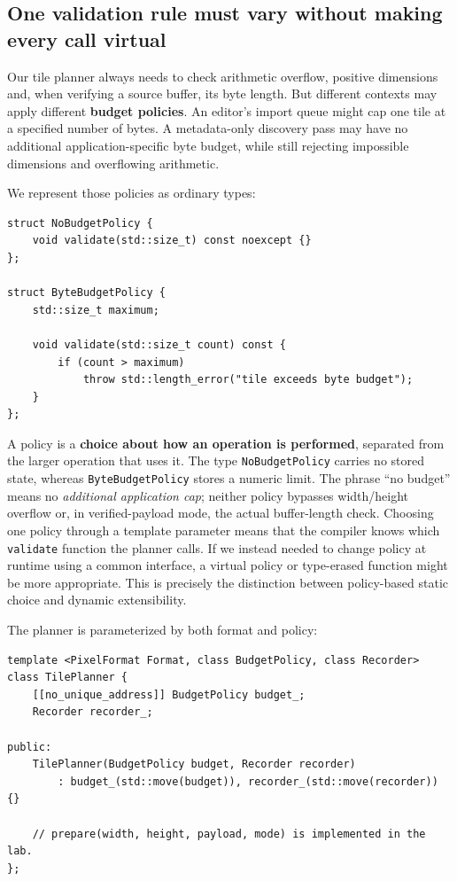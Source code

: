 \subsection{One validation rule must vary without making every call virtual}\label{05-engine-i-ch005-one-validation-rule-must-vary-without-making-every-call-virtual}

Our tile planner always needs to check arithmetic overflow, positive dimensions and, when verifying a source buffer, its byte length. But different contexts may apply different \textbf{budget policies}. An editor's import queue might cap one tile at a specified number of bytes. A metadata-only discovery pass may have no additional application-specific byte budget, while still rejecting impossible dimensions and overflowing arithmetic.

We represent those policies as ordinary types:

\begin{verbatim}
struct NoBudgetPolicy {
    void validate(std::size_t) const noexcept {}
};

struct ByteBudgetPolicy {
    std::size_t maximum;

    void validate(std::size_t count) const {
        if (count > maximum)
            throw std::length_error("tile exceeds byte budget");
    }
};
\end{verbatim}

A policy is a \textbf{choice about how an operation is performed}, separated from the larger operation that uses it. The type \texttt{NoBudgetPolicy} carries no stored state, whereas \texttt{ByteBudgetPolicy} stores a numeric limit. The phrase ``no budget'' means no \emph{additional application cap}; neither policy bypasses width/height overflow or, in verified-payload mode, the actual buffer-length check. Choosing one policy through a template parameter means that the compiler knows which \texttt{validate} function the planner calls. If we instead needed to change policy at runtime using a common interface, a virtual policy or type-erased function might be more appropriate. This is precisely the distinction between policy-based static choice and dynamic extensibility.

The planner is parameterized by both format and policy:

\begin{verbatim}
template <PixelFormat Format, class BudgetPolicy, class Recorder>
class TilePlanner {
    [[no_unique_address]] BudgetPolicy budget_;
    Recorder recorder_;

public:
    TilePlanner(BudgetPolicy budget, Recorder recorder)
        : budget_(std::move(budget)), recorder_(std::move(recorder)) {}

    // prepare(width, height, payload, mode) is implemented in the lab.
};
\end{verbatim}

